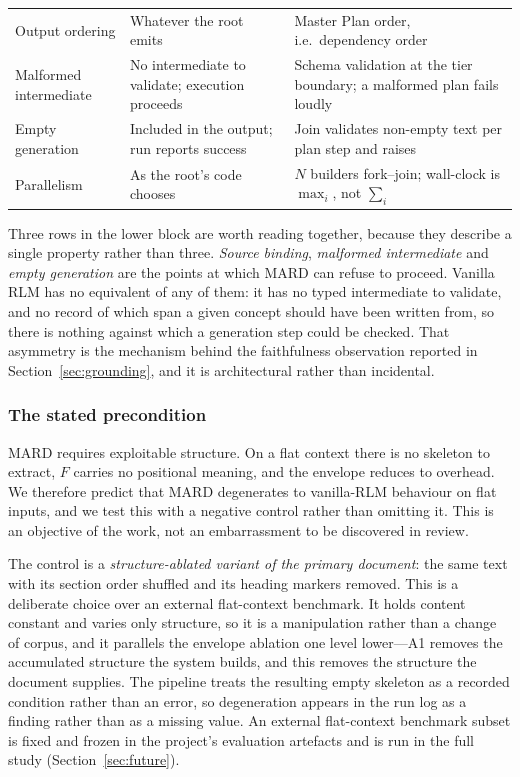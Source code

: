 \documentclass[conference]{IEEEtran}
\begin{document}
\begin{table}[!t]
\begin{tabular}{@{}p{3.5cm}p{6.0cm}p{6.4cm}@{}}
Output ordering & Whatever the root emits & Master Plan order, i.e.\ dependency order \\
Malformed intermediate & No intermediate to validate; execution proceeds & Schema validation at the tier boundary; a malformed plan fails loudly \\
Empty generation & Included in the output; run reports success & Join validates non-empty text per plan step and raises \\
Parallelism & As the root's code chooses & $N$ builders fork--join; wall-clock is $\max_i$, not $\sum_i$ \\
\bottomrule
\end{tabular}
\end{table}

Three rows in the lower block are worth reading together, because they describe
a single property rather than three. \emph{Source binding}, \emph{malformed
intermediate} and \emph{empty generation} are the points at which MARD can
refuse to proceed. Vanilla RLM has no equivalent of any of them: it has no
typed intermediate to validate, and no record of which span a given concept
should have been written from, so there is nothing against which a generation
step could be checked. That asymmetry is the mechanism behind the
faithfulness observation reported in Section~\ref{sec:grounding}, and it is
architectural rather than incidental.

\subsubsection{The stated precondition}
\label{sec:precondition}
MARD requires exploitable structure. On a flat context there is no skeleton
to extract, $F$ carries no positional meaning, and the envelope reduces to
overhead. We therefore predict that MARD degenerates to vanilla-RLM behaviour
on flat inputs, and we test this with a negative control rather than omitting
it. This is an objective of the work, not an embarrassment to be discovered
in review.

The control is a \emph{structure-ablated variant of the primary document}: the
same text with its section order shuffled and its heading markers removed.
This is a deliberate choice over an external flat-context benchmark. It holds
content constant and varies only structure, so it is a manipulation rather
than a change of corpus, and it parallels the envelope ablation one level
lower---A1 removes the accumulated structure the system builds, and this
removes the structure the document supplies. The pipeline treats the resulting
empty skeleton as a recorded condition rather than an error, so degeneration
appears in the run log as a finding rather than as a missing value. An
external flat-context benchmark subset is fixed and frozen in the project's
evaluation artefacts and is run in the full study
(Section~\ref{sec:future}).
\end{document}
